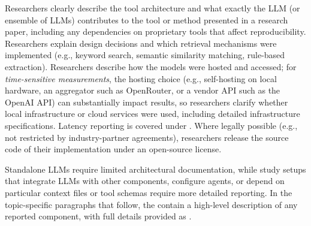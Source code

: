 
Researchers \must clearly describe the tool architecture and what exactly the LLM (or ensemble of LLMs) contributes to the tool or method presented in a research paper, including any dependencies on proprietary tools that affect reproducibility.
Researchers \should explain design decisions and which retrieval mechanisms were implemented (e.g., keyword search, semantic similarity matching, rule-based extraction).
Researchers \should describe how the models were hosted and accessed; for \emph{time-sensitive measurements}, the hosting choice (e.g., self-hosting on local hardware, an aggregator such as OpenRouter, or a vendor API such as the OpenAI API) can substantially impact results, so researchers \must clarify whether local infrastructure or cloud services were used, including detailed infrastructure specifications. Latency reporting is covered under \benchmarksmetrics.
Where legally possible (e.g., not restricted by industry-partner agreements), researchers \should release the source code of their implementation under an open-source license.

Standalone LLMs require limited architectural documentation, while study setups that integrate LLMs with other components, configure agents, or depend on particular context files or tool schemas require more detailed reporting. In the topic-specific paragraphs that follow, the \paper \must contain a high-level description of any reported component, with full details provided as \supplementarymaterial.

